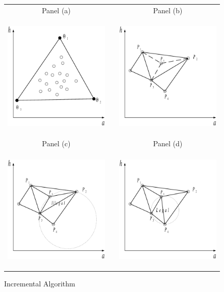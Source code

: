 \documentclass[a4paper,12pt]{article}
\begin{document}
\begin{figure}[htbp]
	\caption{Incremental Algorithm}
	\label{Delaunay Triangulation Computational}
	\centering
	\begin{tabular}{cC{1cm}c}
	Panel (a) & & Panel (b)  \\
	\includegraphics[height=6.0cm, width=6.0cm]{Abbildungen/Incremental_0.eps} & & \includegraphics[height=6.0cm, width=6.0cm]{Abbildungen/Incremental_1.eps}  \\
	Panel (c) & & Panel (d)  \\
	\includegraphics[height=6.0cm, width=6.0cm]{Abbildungen/Incremental_2.eps} & & \includegraphics[height=6.0cm, width=6.0cm]{Abbildungen/Incremental_3.eps}  \\

\end{tabular}
\end{figure}
\end{document}
